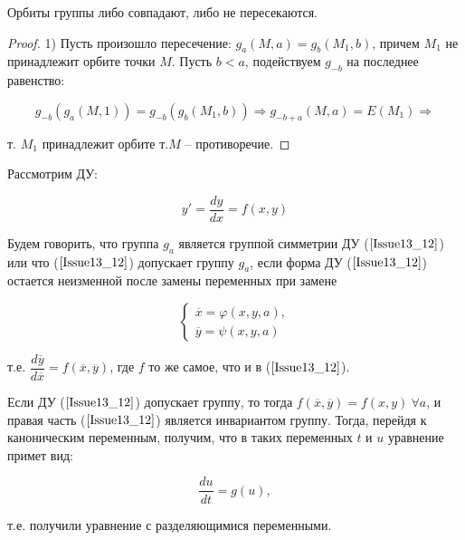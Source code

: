 \begin{theorem}

Орбиты группы либо совпадают, либо не пересекаются.

\begin{proof}

1) Пусть произошло пересечение: $g_a(M,a) = g_b(M_1,b)$, причем $M_1$ не принадлежит орбите точки $M$. Пусть $b < a$, подействуем $g_{-b}$ на последнее равенство:

\[ g_{-b}(g_a(M,1)) = g_{-b}(g_b(M_1, b)) \Rightarrow g_{-b+a}(M,a) = E(M_1) \Rightarrow\]

т. $M_1$ принадлежит орбите т.$M$ -- противоречие.

\end{proof}

\end{theorem}


Рассмотрим ДУ: 

\begin{equation}
 	y' = \dfrac{dy}{dx} = f(x,y)
 	\label{Issue13_12}
\end{equation}

Будем говорить, что группа $g_a$ является группой симметрии ДУ ($\ref{Issue13_12}$) или что ($\ref{Issue13_12}$) допускает группу $g_a$, если форма ДУ ($\ref{Issue13_12}$) остается неизменной после замены переменных при замене 

\begin{equation}
	\begin{cases}
	\overline{x} = \varphi(x,y,a), \\
	\overline{y} = \psi(x,y,a)
	\end{cases}
\end{equation}

т.е. $\dfrac{d\overline{y}}{d\overline{x}} = f(\overline{x}, \overline{y})$, где $f$ то же самое, что и в ($\ref{Issue13_12}$).

Если ДУ ($\ref{Issue13_12}$) допускает группу, то тогда $f(\overline{x}, \overline{y}) = f(x,y)\ \forall a$, и правая часть ($\ref{Issue13_12}$) является инвариантом группу. Тогда, перейдя к каноническим переменным, получим, что в таких переменных $t$ и $u$ уравнение примет вид:

\begin{equation}
	\dfrac{du}{dt} = g(u),
	\label{Issue13_13}
\end{equation}

т.е. получили уравнение с разделяющимися переменными.
























 
